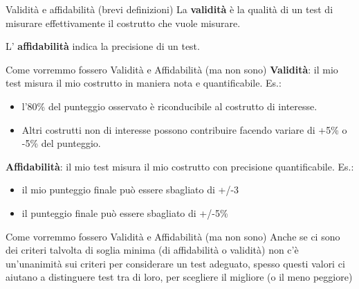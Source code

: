 \documentclass[
  ignorenonframetext,
]{beamer}
\providecommand{\tightlist}{%
  \setlength{\itemsep}{0pt}\setlength{\parskip}{0pt}}
\begin{document}
\begin{frame}{Validità e affidabilità (brevi definizioni)}
\label{validituxe0-e-affidabilituxe0-brevi-definizioni}
La \textbf{validità} è la qualità di un test di misurare effettivamente
il costrutto che vuole misurare.

L' \textbf{affidabilità} indica la precisione di un test.
\end{frame}

\begin{frame}{Come vorremmo fossero Validità e Affidabilità (ma non
sono)}
\label{come-vorremmo-fossero-validituxe0-e-affidabilituxe0-ma-non-sono}
\textbf{Validità}: il mio test misura il mio costrutto in maniera nota e
quantificabile. Es.:

\begin{itemize}
\tightlist
\item
  l'80\% del punteggio osservato è riconducibile al costrutto di
  interesse.
\item
  Altri costrutti non di interesse possono contribuire facendo variare
  di +5\% o -5\% del punteggio.
\end{itemize}

\vfill
\pause

\textbf{Affidabilità}: il mio test misura il mio costrutto con
precisione quantificabile. Es.:

\begin{itemize}
\tightlist
\item
  il mio punteggio finale può essere sbagliato di +/-3
\item
  il punteggio finale può essere sbagliato di +/-5\%
\end{itemize}
\end{frame}

\begin{frame}{Come vorremmo fossero Validità e Affidabilità (ma non
sono)}
\label{come-vorremmo-fossero-validituxe0-e-affidabilituxe0-ma-non-sono-1}
Anche se ci sono dei criteri talvolta di soglia minima (di affidabilità
o validità) non c'è un'unanimità sui criteri per considerare un test
adeguato, spesso questi valori ci aiutano a distinguere test tra di
loro, per scegliere il migliore (o il meno peggiore)

\vfill

\begin{center}
\end{center}
\end{frame}
\end{document}
